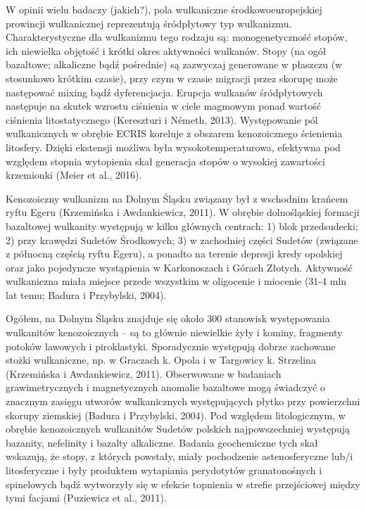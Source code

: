\documentclass[11.5pt,twoside]{report}
\begin{document}
W opinii wielu badaczy (jakich?), pola wulkaniczne środkowoeuropejskiej prowincji wulkanicznej reprezentują śródpłytowy typ wulkanizmu. Charakterystyczne dla wulkanizmu tego rodzaju są: monogenetyczność stopów, ich niewielka objętość i krótki okres aktywności wulkanów. Stopy (na ogół bazaltowe; alkaliczne bąd\'{z} pośrednie) są zazwyczaj generowane w płaszczu (w stosunkowo krótkim czasie), przy czym w czasie migracji przez skorupę może następować mixing bąd\'{z} dyferencjacja. Erupcja wulkanów śródpłytowych następuje na skutek wzrostu ciśnienia w ciele magmowym ponad wartość ciśnienia litostatycznego (Kereszturi i Németh, 2013). Występowanie pól wulkanicznych w obrębie ECRIS koreluje z obszarem kenozoicznego ścienienia litosfery. Dzięki ekstensji możliwa była wysokotemperaturowa, efektywna pod względem stopnia wytopienia skał generacja stopów o wysokiej zawartości krzemionki (Meier et al., 2016).

Kenozoiczny wulkanizm na Dolnym Śląsku związany był z wschodnim krańcem ryftu Egeru (Krzemińska i Awdankiewicz, 2011). W obrębie dolnośląskiej formacji bazaltowej wulkanity występują w kilku głównych centrach: 1) blok przedsudecki; 2) przy krawędzi Sudetów Środkowych; 3) w zachodniej części Sudetów (związane z północną częścią ryftu Egeru), a ponadto na terenie depresji kredy opolskiej oraz jako pojedyncze wystąpienia w Karkonoszach i Górach Złotych. Aktywność wulkaniczna miała miejsce przede wszystkim w oligocenie i miocenie (31-4 mln lat temu; Badura i Przybylski, 2004).

Ogółem, na Dolnym Śląsku znajduje się około 300 stanowisk występowania wulkanitów kenozoicznych -- są to głównie niewielkie żyły i kominy, fragmenty potoków lawowych i piroklastyki. Sporadycznie występują dobrze zachowane stożki wulkaniczne, np. w Graczach k. Opola i w Targowicy k. Strzelina (Krzemińska i Awdankiewicz, 2011). Obserwowane w badaniach grawimetrycznych i magnetycznych anomalie bazaltowe mogą świadczyć o znacznym zasięgu utworów wulkanicznych występujących płytko przy powierzchni skorupy ziemskiej (Badura i Przybylski, 2004). Pod względem litologicznym, w obrębie kenozoicznych wulkanitów Sudetów polskich najpowszechniej występują bazanity, nefelinity i bazalty alkaliczne. Badania geochemiczne tych skał wskazują, że stopy, z których powstały, miały pochodzenie astenosferyczne lub/i litosferyczne i były produktem wytapiania perydotytów granatonośnych i spinelowych bąd\'{z} wytworzyły się w efekcie topnienia w strefie przejściowej między tymi facjami (Puziewicz et al., 2011).
\end{document}
